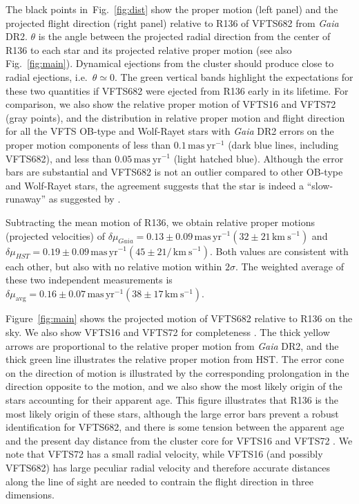 \documentclass[a4paper,fleqn,usenatbib]{mnras}
\newcommand{\kms}{{\,\mathrm{km\ s^{-1}}}}
\newcommand{\masyr}{\,\mathrm{mas}\,\mathrm{yr}^{-1}}
\DeclareRobustCommand{\Figref}[1]{Fig.~\ref{#1}}
\begin{document}
The black points in~\Figref{fig:dist} show the proper motion 
(left panel) and the projected flight direction (right panel) relative
to R136 of
VFTS682 from \emph{Gaia} DR2. $\theta$ is the angle between the projected radial direction from the
center of R136 to each star and its projected relative proper motion
(see also \Figref{fig:main}). Dynamical ejections from the
cluster should %
produce close to radial ejections, i.e.~$\theta\simeq0$. The green
vertical bands highlight the expectations for these two quantities if VFTS682 were ejected from R136 early in its
lifetime. For comparison, we also show the relative
proper motion of VFTS16 and VFTS72 (gray points), and the distribution
in relative proper motion and flight direction for all the VFTS OB-type and Wolf-Rayet stars with
\emph{Gaia} DR2 errors on the proper motion
components of less than $0.1\,\mathrm{mas\ yr^{-1}}$ (dark blue lines,
including VFTS682), and less than $0.05\,\mathrm{mas\ yr^{-1}}$ (light hatched
blue). Although the error bars are substantial and VFTS682 is not
an outlier compared to other OB-type and Wolf-Rayet stars, the agreement
suggests that the star is indeed a ``slow-runaway'' as suggested by
\cite{bestenlehner:11}. 

Subtracting
the mean motion of R136, we obtain relative proper motions (projected
velocities) of $\delta \mu_{Gaia}=0.13\pm 0.09\masyr (32\pm 21\kms)$ and
$\delta \mu_{HST}=0.19\pm 0.09\masyr (45 \pm 21/\kms )$. Both values
are consistent with each other, but also with no relative motion
within $2\sigma$. The weighted average of these two independent
measurements is $\delta \mu_\mathrm{avg}=0.16\pm0.07\masyr
(38\pm17\kms)$. 

Figure~\ref{fig:main} shows the projected motion of VFTS682 relative to R136 on the
sky. We also show VFTS16 and VFTS72 for completeness
\citep[see][]{lennon:18}. The thick yellow arrows are proportional to
the relative proper motion from \emph{Gaia} DR2, and the thick green
line illustrates the relative proper motion from HST. The error cone
on the direction of motion is illustrated by the corresponding
prolongation in the direction opposite to the motion, and we also show
the most likely origin of the stars accounting for their apparent age.
This figure illustrates that R136 is the most likely origin of these stars, although the large error bars
prevent a robust identification for VFTS682, and there is some tension
between the apparent age and the present day distance from the cluster
core for VFTS16 and VFTS72 \citep[][]{lennon:18}. We note that
VFTS72 has a small radial velocity, while VFTS16 (and possibly VFTS682) has
large peculiar radial velocity and therefore accurate distances along
the line of sight are
needed to contrain the flight direction in three dimensions.
\end{document}
